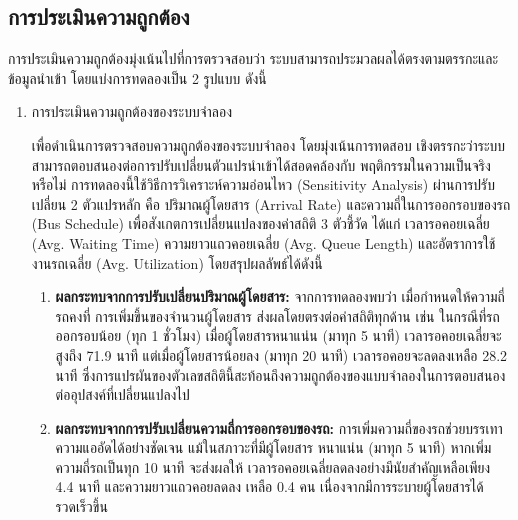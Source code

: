 \subsection{การประเมินความถูกต้อง}
\begin{mypara}
    \indent การประเมินความถูกต้องมุ่งเน้นไปที่การตรวจสอบว่า
    ระบบสามารถประมวลผลได้ตรงตามตรรกะและข้อมูลนำเข้า โดยแบ่งการทดลองเป็น 2 รูปแบบ ดังนี้
\end{mypara}
    \begin{enumerate}
        \item การประเมินความถูกต้องของระบบจำลอง
            \begin{mypara}
                \indent เพื่อดำเนินการตรวจสอบความถูกต้องของระบบจำลอง โดยมุ่งเน้นการทดสอบ
                เชิงตรรกะว่าระบบสามารถตอบสนองต่อการปรับเปลี่ยนตัวแปรนำเข้าได้สอดคล้องกับ
                พฤติกรรมในความเป็นจริงหรือไม่ การทดลองนี้ใช้วิธีการวิเคราะห์ความอ่อนไหว 
                (Sensitivity Analysis) ผ่านการปรับเปลี่ยน 2 ตัวแปรหลัก คือ 
                ปริมาณผู้โดยสาร (Arrival Rate) และความถี่ในการออกรอบของรถ (Bus Schedule)
                เพื่อสังเกตการเปลี่ยนแปลงของค่าสถิติ 3 ตัวชี้วัด ได้แก่ เวลารอคอยเฉลี่ย
                 (Avg. Waiting Time) ความยาวแถวคอยเฉลี่ย (Avg. Queue Length) 
                 และอัตราการใช้งานรถเฉลี่ย (Avg. Utilization) โดยสรุปผลลัพธ์ได้ดังนี้
            \end{mypara}
                \begin{enumerate}
                    \item \textbf{ผลกระทบจากการปรับเปลี่ยนปริมาณผู้โดยสาร:}
                    จากการทดลองพบว่า เมื่อกำหนดให้ความถี่รถคงที่ การเพิ่มขึ้นของจำนวนผู้โดยสาร
                    ส่งผลโดยตรงต่อค่าสถิติทุกด้าน เช่น ในกรณีที่รถออกรอบน้อย (ทุก 1 ชั่วโมง) 
                    เมื่อผู้โดยสารหนาแน่น (มาทุก 5 นาที) เวลารอคอยเฉลี่ยจะสูงถึง 71.9 นาที 
                    แต่เมื่อผู้โดยสารน้อยลง (มาทุก 20 นาที) เวลารอคอยจะลดลงเหลือ 28.2 นาที
                    ซึ่งการแปรผันของตัวเลขสถิตินี้สะท้อนถึงความถูกต้องของแบบจำลองในการตอบสนองต่ออุปสงค์ที่เปลี่ยนแปลงไป

                    \item \textbf{ผลกระทบจากการปรับเปลี่ยนความถี่การออกรอบของรถ:} 
                    การเพิ่มความถี่ของรถช่วยบรรเทาความแออัดได้อย่างชัดเจน แม้ในสภาวะที่มีผู้โดยสาร
                    หนาแน่น (มาทุก 5 นาที) หากเพิ่มความถี่รถเป็นทุก 10 นาที จะส่งผลให้
                    เวลารอคอยเฉลี่ยลดลงอย่างมีนัยสำคัญเหลือเพียง 4.4 นาที และความยาวแถวคอยลดลง
                    เหลือ 0.4 คน เนื่องจากมีการระบายผู้โดยสารได้รวดเร็วขึ้น
                \end{enumerate}


\end{enumerate}
